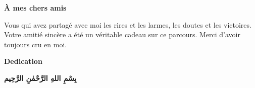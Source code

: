 \documentclass[12pt,a4paper]{report}
\begin{document}
\textbf{À mes chers amis}

Vous qui avez partagé avec moi les rires et les larmes, les doutes et les victoires. Votre amitié sincère a été un véritable cadeau sur ce parcours. Merci d'avoir toujours cru en moi.


\newpage
\thispagestyle{fancy}

\begin{center}
    {\Large \textbf{Dedication}}
\end{center}

\vspace{0.5cm}

\begin{center}
    {\Large \textbf{بِسْمِ اللهِ الرَّحْمٰنِ الرَّحِيم}}
\end{center}

\vspace{0.5cm}
\end{document}
